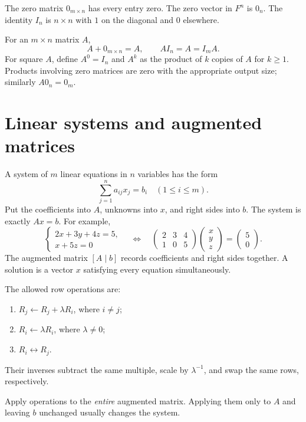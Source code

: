 \begin{definition}
The zero matrix $0_{m\times n}$ has every entry zero. The zero vector in
$F^n$ is $0_n$. The identity $I_n$ is $n\times n$ with $1$ on the diagonal
and $0$ elsewhere.
\end{definition}
For an $m\times n$ matrix $A$,
\[
A+0_{m\times n}=A,\qquad A I_n=A=I_mA.
\]
For square $A$, define $A^0=I_n$ and $A^k$ as the product of $k$ copies of
$A$ for $k\geq1$. Products involving zero matrices are zero with the
appropriate output size; similarly $A0_n=0_m$.

\section{Linear systems and augmented matrices}
A system of $m$ linear equations in $n$ variables has the form
\[
\sum_{j=1}^n a_{ij}x_j=b_i\quad(1\leq i\leq m).
\]
Put the coefficients into $A$, unknowns into $x$, and right sides into $b$.
The system is exactly $Ax=b$. For example,
\[
\begin{cases}2x+3y+4z=5,\\x+5z=0\end{cases}
\quad\Longleftrightarrow\quad
\begin{pmatrix}2&3&4\\1&0&5\end{pmatrix}
\begin{pmatrix}x\\y\\z\end{pmatrix}=\begin{pmatrix}5\\0\end{pmatrix}.
\]
The augmented matrix $[A\mid b]$ records coefficients and right sides together.
A solution is a vector $x$ satisfying every equation simultaneously.

\begin{definition}
The allowed row operations are:
\begin{enumerate}
\item $R_j\leftarrow R_j+\lambda R_i$, where $i\ne j$;
\item $R_i\leftarrow\lambda R_i$, where $\lambda\ne0$;
\item $R_i\leftrightarrow R_j$.
\end{enumerate}
Their inverses subtract the same multiple, scale by $\lambda^{-1}$, and
swap the same rows, respectively.
\end{definition}
Apply operations to the \emph{entire} augmented matrix. Applying them only
to $A$ and leaving $b$ unchanged usually changes the system.

